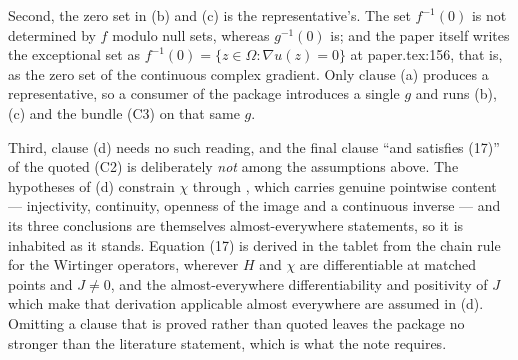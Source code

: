 \begin{definition}
Second, the zero set in (b) and (c) is the representative's.  The set
$f^{-1}(0)$ is not determined by $f$ modulo null sets, whereas $g^{-1}(0)$ is;
and the paper itself writes the exceptional set as
$f^{-1}(0)=\{z\in\Omega:\nabla u(z)=0\}$ at paper.tex:156, that is, as the zero
set of the continuous complex gradient.  Only clause (a) produces a
representative, so a consumer of the package introduces a single $g$ and runs
(b), (c) and the bundle (C3) on that same $g$.

Third, clause (d) needs no such reading, and the final clause ``and satisfies
(17)'' of the quoted (C2) is deliberately \emph{not} among the assumptions
above.  The hypotheses of (d) constrain $\chi$ through
, which carries genuine pointwise content ---
injectivity, continuity, openness of the image and a continuous inverse ---
and its three conclusions are themselves almost-everywhere statements, so it
is inhabited as it stands.  Equation (17) is derived in the tablet from the
chain rule for the Wirtinger operators, wherever $H$ and $\chi$ are
differentiable at matched points and $J\neq0$, and the almost-everywhere
differentiability and positivity of $J$ which make that derivation applicable
almost everywhere are assumed in (d).  Omitting a clause that is proved rather
than quoted leaves the package no stronger than the literature statement, which
is what the note requires.
\end{definition}
